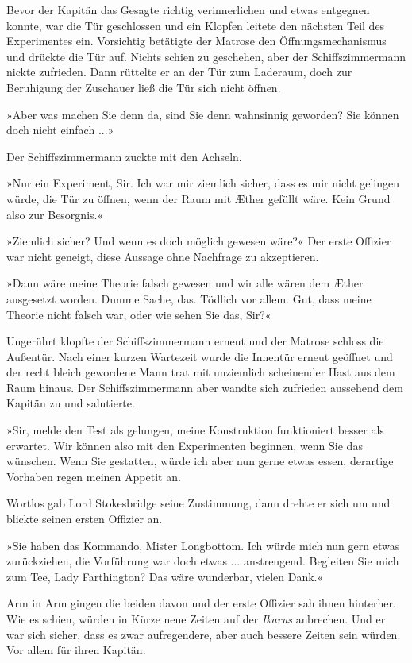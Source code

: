 Bevor der Kapitän das Gesagte richtig verinnerlichen und etwas
entgegnen konnte, war die Tür geschlossen und ein Klopfen leitete
den nächsten Teil des Experimentes ein. Vorsichtig betätigte der
Matrose den Öffnungsmechanismus und drückte die Tür auf. Nichts
schien zu geschehen, aber der Schiffszimmermann nickte zufrieden.
Dann rüttelte er an der Tür zum Laderaum, doch zur Beruhigung der
Zuschauer ließ die Tür sich nicht öffnen.

»Aber was machen Sie denn da, sind Sie denn wahnsinnig geworden?
Sie können doch nicht einfach ...»

Der Schiffszimmermann zuckte mit den Achseln.

»Nur ein Experiment, Sir. Ich war mir ziemlich sicher, dass es mir
nicht gelingen würde, die Tür zu öffnen, wenn der Raum mit Æther
gefüllt wäre. Kein Grund also zur Besorgnis.«

»Ziemlich sicher? Und wenn es doch möglich gewesen wäre?« Der erste
Offizier war nicht geneigt, diese Aussage ohne Nachfrage zu
akzeptieren.

»Dann wäre meine Theorie falsch gewesen und wir alle wären dem
Æther ausgesetzt worden. Dumme Sache, das. Tödlich vor allem. Gut,
dass meine Theorie nicht falsch war, oder wie sehen Sie das, Sir?«

Ungerührt klopfte der Schiffszimmermann erneut und der Matrose
schloss die Außentür. Nach einer kurzen Wartezeit wurde die
Innentür erneut geöffnet und der recht bleich gewordene Mann trat
mit unziemlich scheinender Hast aus dem Raum hinaus. Der
Schiffszimmermann aber wandte sich zufrieden aussehend dem Kapitän
zu und salutierte.

»Sir, melde den Test als gelungen, meine Konstruktion funktioniert
besser als erwartet. Wir können also mit den Experimenten beginnen,
wenn Sie das wünschen. Wenn Sie gestatten, würde ich aber nun gerne
etwas essen, derartige Vorhaben regen meinen Appetit an.

Wortlos gab Lord Stokesbridge seine Zustimmung, dann drehte er sich
um und blickte seinen ersten Offizier an.

»Sie haben das Kommando, Mister Longbottom. Ich würde mich nun gern
etwas zurückziehen, die Vorführung war doch etwas ... anstrengend.
Begleiten Sie mich zum Tee, Lady Farthington? Das wäre wunderbar,
vielen Dank.«

Arm in Arm gingen die beiden davon und der erste Offizier sah ihnen
hinterher. Wie es schien, würden in Kürze neue Zeiten auf der
\emph{Ikarus} anbrechen. Und er war sich sicher, dass es zwar
aufregendere, aber auch bessere Zeiten sein würden. Vor allem für
ihren Kapitän.


